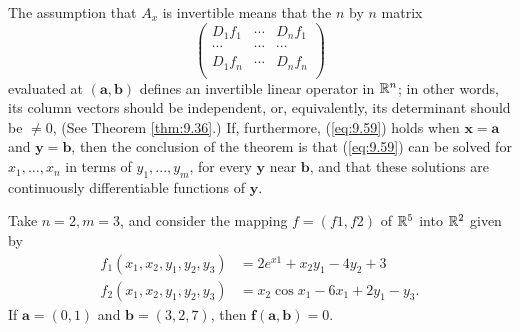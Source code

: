 The assumption that $A_x$ is invertible means that the $n$ by $n$ matrix
\begin{equation*}
    \begin{pmatrix}
        D_1 f_1 & \cdots & D_n f_1 \\
        \cdots  & \cdots & \cdots  \\
        D_1 f_n & \cdots & D_n f_n \\
    \end{pmatrix}
\end{equation*}
evaluated at $\mathbf{(a, b)}$ defines an invertible linear operator in ${\protect\mathbb R}^n$; 
in other words,
its column vectors should be independent, or, equivalently, its determinant
should be $\neq 0$, (See Theorem \ref{thm:9.36}.) 
If, furthermore, (\ref{eq:9.59}) holds when $\mathbf{x = a}$ and $\mathbf{y = b}$, 
then the conclusion of the theorem is that (\ref{eq:9.59}) 
can be solved for $x_1, \dots , x_n$
in terms of $y_1, ... , y_m$, for every $\mathbf{y}$ near $\mathbf{b}$, 
and that these solutions are continuously differentiable functions of $\mathbf{y}$.



\begin{newexample}
    Take $n = 2, m = 3$, and consider the mapping $f = (f1, f2)$ of
    ${\protect\mathbb R}^5$ into ${\protect\mathbb R}^2$ given by
    \begin{align*}
        f_1(x_1, x_2, y_1, y_2, y_3) &= 2 e^{x1} + x_2 y_1 - 4 y_2 + 3 \\
        f_2(x_1, x_2, y_1, y_2, y_3) &= x_2 \cos x_1 - 6 x_1 + 2 y_1 - y_3.
    \end{align*}
    If $\mathbf{a} = (0, 1)$ and $\mathbf{b} = (3, 2, 7)$, 
    then $\mathbf{f(a, b)} = 0$.

\end{newexample}